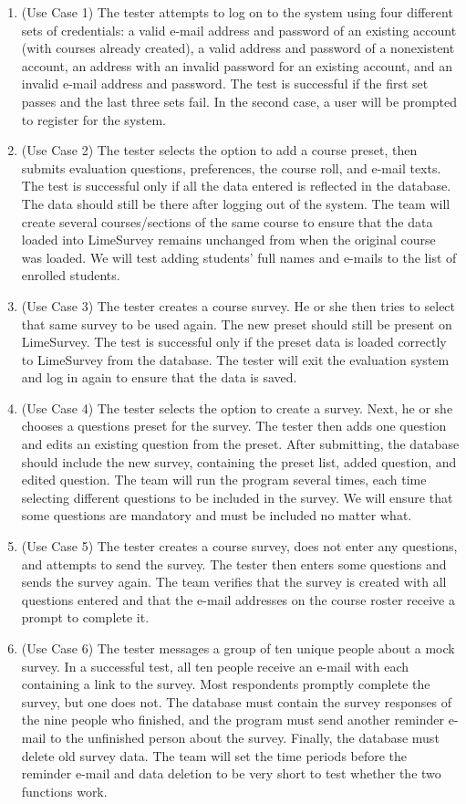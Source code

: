 \documentclass{article}
\begin{document}
\begin{enumerate}
  \item (Use Case 1) The tester attempts to log on to the system using four different sets of credentials: a valid e-mail address and password of an existing account (with courses already created), a valid address and password of a nonexistent account, an address with an invalid password for an existing account, and an invalid e-mail address and password. The test is successful if the first set passes and the last three sets fail. In the second case, a user will be prompted to register for the system. 
  \item (Use Case 2) The tester selects the option to add a course preset, then submits evaluation questions, preferences, the course roll, and e-mail texts. The test is successful only if all the data entered is reflected in the database.  The data should still be there after logging out of the system. The team will create several courses/sections of the same course to ensure that the data loaded into LimeSurvey remains unchanged from when the original course was loaded. We will test adding students' full names and e-mails to the list of enrolled students.
  \item (Use Case 3) The tester creates a course survey. He or she then tries to select that same survey to be used again. The new preset should still be present on LimeSurvey. The test is successful only if the preset data is loaded correctly to LimeSurvey from the database. The tester will exit the evaluation system and log in again to ensure that the data is saved.
  \item (Use Case 4) The tester selects the option to create a survey. Next, he or she chooses a questions preset for the survey. The tester then adds one question and edits an existing question from the preset. After submitting, the database should include the new survey, containing the preset list, added question, and edited question. The team will run the program several times, each time selecting different questions to be included in the survey. We will ensure that some questions are mandatory and must be included no matter what.
  \item (Use Case 5) The tester creates a course survey, does not enter any questions, and attempts to send the survey.  The tester then enters some questions and sends the survey again.  The team verifies that the survey is created with all questions entered and that the e-mail addresses on the course roster receive a prompt to complete it. 
  \item (Use Case 6) The tester messages a group of ten unique people about a mock survey. In a successful test, all ten people receive an e-mail with each containing a link to the survey. Most respondents promptly complete the survey, but one does not. The database must contain the survey responses of the nine people who finished, and the program must send another reminder e-mail to the unfinished person about the survey. Finally, the database must delete old survey data. The team will set the time periods before the reminder e-mail and data deletion to be very short to test whether the two functions work.

\end{enumerate}
\end{document}
